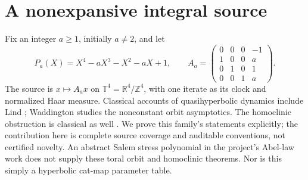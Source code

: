 \documentclass[10pt]{article}
\begin{document}
\section{A nonexpansive integral source}
Fix an integer $a\ge1$, initially $a\ne2$, and let
\[
 P_a(X)=X^4-aX^3-X^2-aX+1,\qquad
 A_a=\begin{pmatrix}0&0&0&-1\\1&0&0&a\\0&1&0&1\\0&0&1&a\end{pmatrix}.
\]
The source is $x\mapsto A_ax$ on $\mathbb T^4=\mathbb R^4/\mathbb Z^4$,
with one iterate as its clock and normalized Haar measure.
Classical accounts of quasihyperbolic dynamics include Lind \cite{lind};
Waddington \cite{waddington} studies the nonconstant orbit asymptotics.
The homoclinic obstruction is classical as well \cite{ls}.
We prove this family's statements explicitly; the contribution here is
complete source coverage and auditable conventions, not certified novelty.
An abstract Salem stress polynomial in the project's Abel-law work does
not supply these toral orbit and homoclinic theorems. Nor is this simply
a hyperbolic cat-map parameter table.
\end{document}
